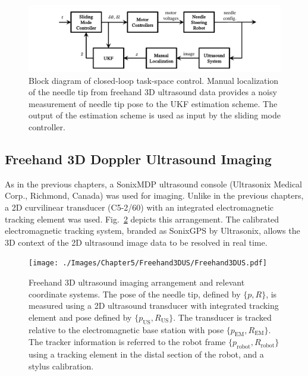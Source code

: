 \begin{figure}[!t]
\centering
\includegraphics[width=\columnwidth]{Images/Chapter5/ClinicalBlockDiagram/ClinicalBlockDiagram}%
\caption[Block diagram of closed-loop task-space control algorithm]{Block diagram of closed-loop task-space control. Manual localization of the needle tip from freehand 3D ultrasound data provides a noisy measurement of needle tip pose to the UKF estimation scheme. The output of the estimation scheme is used as input by the sliding mode controller.}
\label{fig:ClinicalBlockDiagram}
\end{figure}

\subsection{Freehand 3D Doppler Ultrasound Imaging}
As in the previous chapters, a SonixMDP ultrasound console (Ultrasonix Medical Corp., Richmond, Canada) was used for imaging. Unlike in the previous chapters, a 2D curvilinear transducer (C5-2/60) with an integrated electromagnetic tracking element was used. Fig.~\ref{fig:freehand3DUS} depicts this arrangement. The calibrated electromagnetic tracking system, branded as SonixGPS by Ultrasonix, allows the 3D context of the 2D ultrasound image data to be resolved in real time. 

\begin{figure}[!ht]
\centering
\texttt{[image: ./Images/Chapter5/Freehand3DUS/Freehand3DUS.pdf]}%
\caption[Freehand 3D ultrasound imaging arrangement]{Freehand 3D ultrasound imaging arrangement and relevant coordinate systems. The pose of the needle tip, defined by $\{p,R\}$, is measured using a 2D ultrasound transducer with integrated tracking element and pose defined by $\{p_{\text{US}},R_{\text{US}}\}$. The transducer is tracked relative to the electromagnetic base station with pose $\{p_{\text{EM}},R_{\text{EM}}\}$. The tracker information is referred to the robot frame $\{p_{\text{robot}},R_{\text{robot}}\}$ using a tracking element in the distal section of the robot, and a stylus calibration.}
\label{fig:freehand3DUS}
\end{figure}

